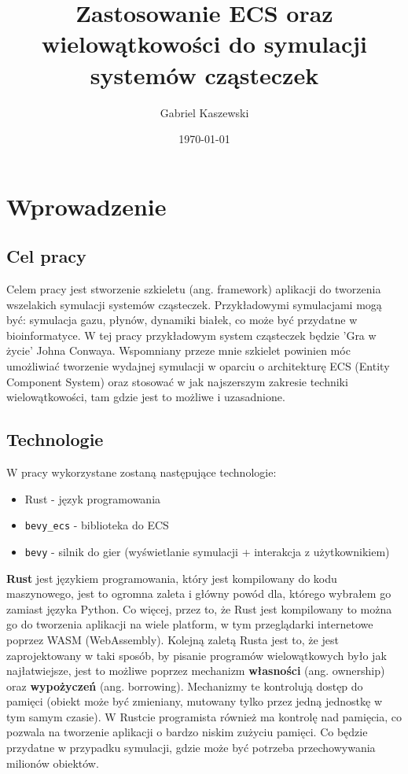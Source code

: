 \documentclass[11pt]{article}
\title{ Zastosowanie ECS oraz wielowątkowości do symulacji systemów cząsteczek }
\author{ Gabriel Kaszewski }
\date{\today}
\begin{document}
\maketitle	
\pagebreak


\section{Wprowadzenie}

\subsection{Cel pracy}
Celem pracy jest stworzenie szkieletu (ang. framework) aplikacji do tworzenia wszelakich symulacji systemów cząsteczek.
Przykładowymi symulacjami mogą być: symulacja gazu, płynów, dynamiki białek, co może być przydatne w bioinformatyce.
W tej pracy przykładowym system cząsteczek będzie 'Gra w życie' Johna Conwaya. Wspomniany przeze mnie szkielet powinien
móc umożliwiać tworzenie wydajnej symulacji w oparciu o architekturę ECS (Entity Component System) oraz stosować
w jak najszerszym zakresie techniki wielowątkowości, tam gdzie jest to możliwe i uzasadnione.

\subsection{Technologie}
W pracy wykorzystane zostaną następujące technologie:
\begin{itemize}
    \item Rust - język programowania
    \item \texttt{bevy\_ecs} - biblioteka do ECS
    \item \texttt{bevy} - silnik do gier (wyświetlanie symulacji + interakcja z użytkownikiem)
\end{itemize}

\textbf{Rust} jest językiem programowania, który jest kompilowany do kodu maszynowego, jest to ogromna zaleta
i główny powód dla, którego wybrałem go zamiast języka Python. Co więcej, przez to, że Rust jest kompilowany to
można go do tworzenia aplikacji na wiele platform, w tym przeglądarki internetowe poprzez WASM (WebAssembly).
Kolejną zaletą Rusta jest to, że jest zaprojektowany w taki sposób, by pisanie programów wielowątkowych było
jak najłatwiejsze, jest to możliwe poprzez mechanizm \textbf{własności} (ang. ownership) oraz \textbf{wypożyczeń}
(ang. borrowing). Mechanizmy te kontrolują dostęp do pamięci (obiekt może być zmieniany, mutowany tylko przez jedną jednostkę w tym samym czasie).
W Rustcie programista również ma kontrolę nad pamięcia, co pozwala na tworzenie aplikacji o bardzo niskim zużyciu pamięci.
Co będzie przydatne w przypadku symulacji, gdzie może być potrzeba przechowywania milionów obiektów.
\end{document}
